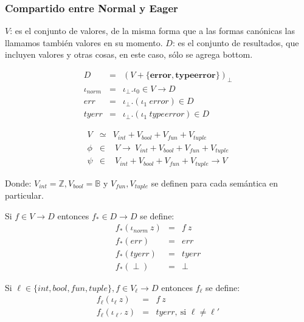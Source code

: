     \subsubsection{Compartido entre Normal y Eager}
      \PN $V$: es el conjunto de valores, de la misma forma que a las formas canónicas las llamamos también valores en su momento.
      \PN $D$: es el conjunto de resultados, que incluyen valores y otras cosas, en este caso, sólo se agrega bottom.

      \begin{multicols}{2}
        \begin{eqnarray*}
          D &=& (V + \{\textbf{error}, \textbf{typeerror}\})_\bot \\
          \iota_{norm} &=& \iota_{\bot} . \iota_{0} \in V \rightarrow D \\
          err &=& \iota_{\bot} . (\iota_{1} \ error) \in D \\
          tyerr &=& \iota_{\bot} . (\iota_{1} \ typeerror) \in D
        \end{eqnarray*}

        \begin{eqnarray*}
          V &\simeq& V_{int} + V_{bool} + V_{fun} + V_{tuple} \\
          \phi &\in& \ V \rightarrow\ V_{int} + V_{bool} + V_{fun} + V_{tuple} \\
          \psi &\in& \ V_{int} + V_{bool} + V_{fun} + V_{tuple} \rightarrow V
        \end{eqnarray*}
      \end{multicols}

      \PN Donde: $V_{int} = \mathbb{Z}, V_{bool} = \mathbb{B}$ y $V_{fun}, V_{tuple}$ se definen para cada semántica en particular.

      \begin{multicols}{2}
        \PN Si $f\in V\rightarrow D$ entonces $f_{*}\in D\rightarrow D$ se define:
        \begin{eqnarray*}
          f_* (\iota_{norm}\ z) &=& f\ z\\
          f_* (err) &=& err\\
          f_* (tyerr) &=& tyerr\\
          f_* (\perp) &=& \perp
        \end{eqnarray*}
        
        \PN Si $\ell \in \{int, bool, fun, tuple\}, f \in V_{\ell} \rightarrow D$ entonces $f_{\ell}$ se define:
        \begin{eqnarray*}
          f_{\ell} (\iota_{\ell}\ z) &=& f\ z\\
          f_{\ell} (\iota_{\ell'}\ z) &=& tyerr, \ \text{si } \ell \neq \ell'
        \end{eqnarray*}
      \end{multicols}

